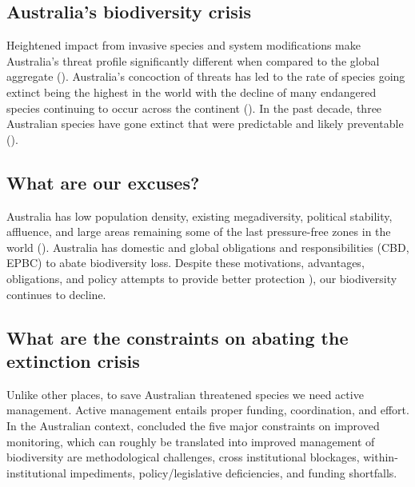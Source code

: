 \documentclass[a4paper,11pt]{article}
\begin{document}
\subsection{Australia's biodiversity crisis}

Heightened impact from invasive species and system modifications make Australia's threat profile significantly different when compared to the global aggregate (\cite{kearneyThreatsAustraliaImperilled2019}). Australia's concoction of threats has led to the rate of species going extinct being the highest in the world with the decline of many endangered species continuing to occur across the continent (\cite{simmondsVulnerableSpeciesEcosystems2020}). In the past decade, three Australian species have gone extinct that were predictable and likely preventable (\cite{woinarskiContributionPolicyLaw2017}).

\subsection{What are our excuses?}

Australia has low population density, existing megadiversity, political stability, affluence, and large areas remaining some of the last pressure-free zones in the world (\cite{venterSixteenYearsChange2016}). Australia has domestic and global obligations and responsibilities (CBD, EPBC) to abate biodiversity loss. Despite these motivations, advantages, obligations, and policy attempts to provide better protection \cite{wardLotsLossLittle2019}), our biodiversity continues to decline.

\subsection{What are the constraints on abating the extinction crisis}

Unlike other places, to save Australian threatened species we need active management. Active management entails proper funding, coordination, and effort. In the Australian context, \cite{leggeMonitoringThreatenedSpecies2018} concluded the five major constraints on improved monitoring, which can roughly be translated into improved management of biodiversity are methodological challenges, cross institutional blockages, within-institutional impediments, policy/legislative deficiencies, and funding shortfalls. 
\end{document}
